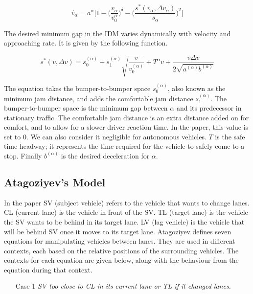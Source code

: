 \begin{appendices}
\begin{equation}
\dot{v_\alpha} = a^{\alpha}\Biggl[1 - \biggl(\frac{v_\alpha}{v_0^\alpha}\biggr)^\delta - \biggl(\frac{s^*(v_\alpha,\Delta v_\alpha)}{s_\alpha}\biggr)^2\Biggr]
\end{equation}

The desired minimum gap in the IDM varies dynamically with velocity and approaching rate. It is given by the following function.

\begin{equation}\label{IDMSpacingFunction}
s^*(v,\Delta v) = s_0^{(\alpha)} + s_1^{(\alpha)}\sqrt{\frac{v}{v_0^{(\alpha)}}} + T^\alpha v + \frac{v\Delta v}{2\sqrt{a^{(\alpha)}b^{(\alpha)}}}
\end{equation}

The equation takes the bumper-to-bumper space $s_0^{(\alpha)}$, also known as the minimum jam distance, and adds the comfortable jam distance $s_1^{(\alpha)}$. The bumper-to-bumper space is the minimum gap between $\alpha$ and its predecessor in stationary traffic. The comfortable jam distance is an extra distance added on for comfort, and to allow for a slower driver reaction time. In the paper, this value is set to $0$. We can also consider it negligible for autonomous vehicles. $T$ is the safe time headway; it represents the time required for the vehicle to safely come to a stop. Finally $b^{(\alpha)}$ is the desired deceleration for $\alpha$.

\subsection{Atagoziyev's Model}
\label{sec:Atagoziyev's Model}

In the paper SV (subject vehicle) refers to the vehicle that wants to change lanes. CL (current lane) is the vehicle in front of the SV. TL (target lane) is the vehicle the SV wants to be behind in its target lane. LV (lag vehicle) is the vehicle that will be behind SV once it moves to its target  lane. Atagoziyev defines seven equations for manipulating vehicles between lanes. They are used in different contexts, each based on the relative positions of the surrounding vehicles. The contexts for each equation are given below, along with the behaviour from the equation during that context.

\begin{enumerate}
\item[Case 1] \textit{SV too close to CL in its current lane or TL if it changed lanes.}


\end{enumerate}
\end{appendices}
